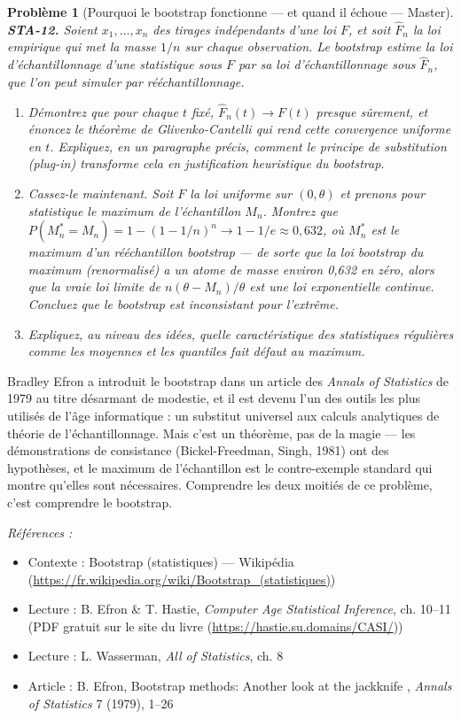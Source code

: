 \documentclass[11pt]{article}
\newtheorem{problem}{Problème}
\newenvironment{refs}{\par\small\noindent\emph{Références :}\begin{itemize}\setlength\itemsep{0pt}}{\end{itemize}\normalsize}
\begin{document}
\begin{problem}[{Pourquoi le bootstrap fonctionne --- et quand il échoue --- Master}]
\textbf{STA-12.} Soient $ x_1, \dots, x_n $ des tirages indépendants d'une loi $ F $, et
soit $ \hat{F}_n $ la loi empirique qui met la masse $ 1/n $ sur chaque observation. Le
bootstrap estime la loi d'échantillonnage d'une statistique sous $ F $ par sa loi
d'échantillonnage sous $ \hat{F}_n $, que l'on peut simuler par rééchantillonnage.
\begin{enumerate}
\item[(a)] Démontrez que pour chaque $ t $ fixé, $ \hat{F}_n(t) \to F(t) $ presque sûrement, et
énoncez le théorème de Glivenko-Cantelli qui rend cette convergence uniforme en $ t $. Expliquez,
en un paragraphe précis, comment le \og{} principe de substitution \fg{} (plug-in) transforme cela en
justification heuristique du bootstrap.
\item[(b)] Cassez-le maintenant. Soit $ F $ la loi uniforme sur $ (0, \theta) $ et prenons pour
statistique le maximum de l'échantillon $ M_n $. Montrez que
$ P(M_n^* = M_n) = 1 - (1 - 1/n)^n \to 1 - 1/e \approx 0{,}632 $, où $ M_n^* $ est le maximum
d'un rééchantillon bootstrap --- de sorte que la loi bootstrap du maximum (renormalisé) a un atome de
masse environ 0,632 en zéro, alors que la vraie loi limite de $ n(\theta - M_n)/\theta $ est une
loi exponentielle continue. Concluez que le bootstrap est inconsistant pour l'extrême.
\item[(c)] Expliquez, au niveau des idées, quelle caractéristique des statistiques \og{} régulières \fg{} comme
les moyennes et les quantiles fait défaut au maximum.
\end{enumerate}

\end{problem}

\noindent Bradley Efron a introduit le bootstrap dans un article des \textit{Annals of
Statistics} de 1979 au titre désarmant de modestie, et il est devenu l'un des outils les plus
utilisés de l'âge informatique : un substitut universel aux calculs analytiques de théorie de
l'échantillonnage. Mais c'est un théorème, pas de la magie --- les démonstrations de consistance
(Bickel-Freedman, Singh, 1981) ont des hypothèses, et le maximum de l'échantillon est le
contre-exemple standard qui montre qu'elles sont nécessaires. Comprendre les deux moitiés de ce
problème, c'est comprendre le bootstrap.

\begin{refs}
\item Contexte : Bootstrap (statistiques) --- Wikipédia (\url{https://fr.wikipedia.org/wiki/Bootstrap_(statistiques)})
\item Lecture : B. Efron \& T. Hastie, \textit{Computer Age Statistical Inference}, ch. 10--11 (PDF gratuit sur le site du livre (\url{https://hastie.su.domains/CASI/}))
\item Lecture : L. Wasserman, \textit{All of Statistics}, ch. 8
\item Article : B. Efron, \og{} Bootstrap methods: Another look at the jackknife \fg{}, \textit{Annals of Statistics} 7 (1979), 1--26
\end{refs}
\end{document}
